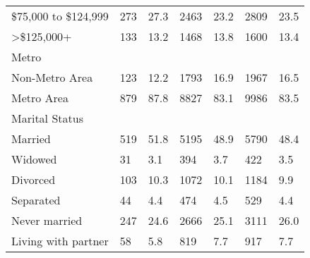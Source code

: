 \begin{longtable}{lllllll}
\$75,000 to \$124,999 & 273 & 27.3 & 2463 & 23.2 & 2809 & 23.5 \\ 
>\$125,000+ & 133 & 13.2 & 1468 & 13.8 & 1600 & 13.4 \\ 
\midrule
\multicolumn{1}{l}{Metro} \\ 
\midrule
Non-Metro Area & 123 & 12.2 & 1793 & 16.9 & 1967 & 16.5 \\ 
Metro Area & 879 & 87.8 & 8827 & 83.1 & 9986 & 83.5 \\ 
\midrule
\multicolumn{1}{l}{Marital Status} \\ 
\midrule
Married & 519 & 51.8 & 5195 & 48.9 & 5790 & 48.4 \\ 
Widowed & 31 & 3.1 & 394 & 3.7 & 422 & 3.5 \\ 
Divorced & 103 & 10.3 & 1072 & 10.1 & 1184 & 9.9 \\ 
Separated & 44 & 4.4 & 474 & 4.5 & 529 & 4.4 \\ 
Never married & 247 & 24.6 & 2666 & 25.1 & 3111 & 26.0 \\ 
Living with partner & 58 & 5.8 & 819 & 7.7 & 917 & 7.7 \\ 
\bottomrule
\end{longtable}

